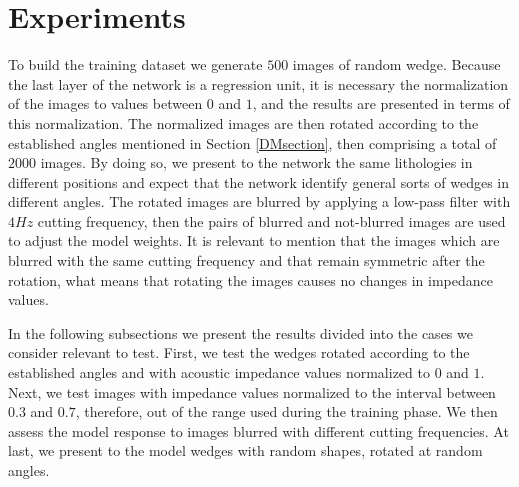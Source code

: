 \documentclass[conference]{IEEEtran}
\begin{document}
\section{Experiments}
To build the training dataset we generate $500$ images of random wedge.
Because the last layer of the network is a regression unit, it is necessary the
normalization of the images to values between $0$ and $1$, and the results
are presented in terms of this normalization.
The normalized images are then rotated according to the established angles mentioned in Section \ref{DMsection},
then comprising a total of $2000$ images. By doing so, we present to
the network the same lithologies in different positions and expect that the network
identify general sorts of wedges in different angles.
The rotated images are blurred by applying a low-pass filter with $4Hz$
cutting frequency, then the pairs of blurred and not-blurred images are used to
adjust the model weights. It is relevant to mention that the images which are blurred with
the same cutting frequency and that remain symmetric after the rotation, what means that rotating the images causes no changes in impedance values.

In the following subsections we present the results divided into the cases we consider relevant to test.
First, we test the wedges rotated according to the established angles and with acoustic impedance values normalized to $0$ and $1$. Next, we test images with impedance values normalized to the interval between $0.3$ and $0.7$, therefore, out of the range used during the training phase. %
We then assess the model response to images blurred with different cutting frequencies.
At last, we present to the model wedges with random shapes, rotated at random angles.
\end{document}
